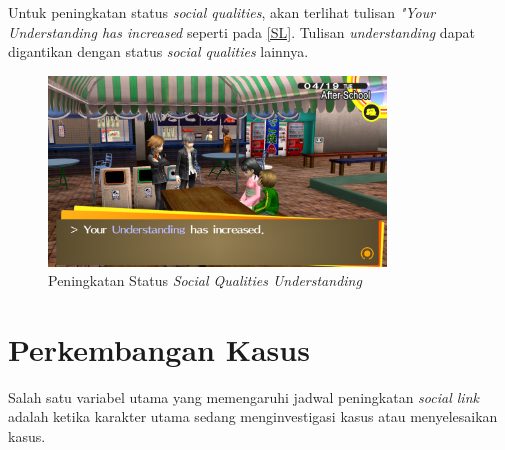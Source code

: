 Untuk peningkatan status \textit{social qualities}, akan terlihat tulisan \textit{"Your Understanding has increased} seperti pada \autoref{SL}. Tulisan \textit{understanding} dapat digantikan dengan status \textit{social qualities} lainnya.
\begin{figure}[htbp]
    \centering
    \includegraphics[width=0.8\textwidth]{resources/Dokumentasi/Screenshot (379).png}
    \caption{\label{SL}Peningkatan Status \textit{Social Qualities Understanding}}
\end{figure}

\section{Perkembangan Kasus}
Salah satu variabel utama yang memengaruhi jadwal peningkatan \textit{social link} adalah ketika karakter utama sedang menginvestigasi kasus atau menyelesaikan kasus.

